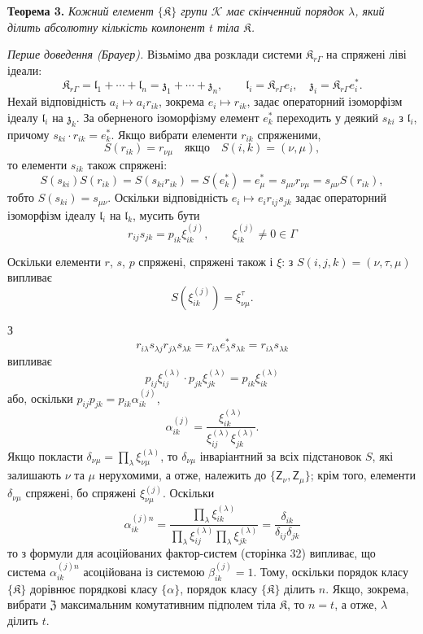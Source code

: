 \documentclass[11pt]{article}
\begin{document}
\textbf{Теорема 3.} \emph{Кожний елемент \(\{\mathfrak K\}\) групи \(\mathscr K\) має скінченний порядок \(\lambda\), який ділить абсолютну кількість компонент \(t\) тіла \(\mathfrak K\).}

\emph{Перше доведення (Брауер).} Візьмімо два розклади системи \(\mathfrak K_{r\Gamma}\) на спряжені ліві ідеали:
\[
\mathfrak K_{r\Gamma}=\mathfrak l_1+\cdots+\mathfrak l_n=\mathfrak z_1+\cdots+\mathfrak z_n,\qquad
\mathfrak l_i=\mathfrak K_{r\Gamma}e_i,\quad
\mathfrak z_i=\mathfrak K_{r\Gamma}e_i^*.
\]
Нехай відповідність \(a_i\mapsto a_ir_{ik}\), зокрема \(e_i\mapsto r_{ik}\), задає операторний ізоморфізм ідеалу \(\mathfrak l_i\) на \(\mathfrak z_k\). За оберненого ізоморфізму елемент \(e_k^*\) переходить у деякий \(s_{ki}\) з \(\mathfrak l_i\), причому \(s_{ki}\cdot r_{ik}=e_k^*\). Якщо вибрати елементи \(r_{ik}\) спряженими,
\[
S(r_{ik})=r_{\nu\mu}\quad\text{якщо}\quad S(i,k)=(\nu,\mu),
\]
то елементи \(s_{ik}\) також спряжені:
\[
S(s_{ki})S(r_{ik})=S(s_{ki}r_{ik})=S(e_k^*)=e_\mu^*
=s_{\mu\nu}r_{\nu\mu}=s_{\mu\nu}S(r_{ik}),
\]
тобто \(S(s_{ki})=s_{\mu\nu}\). Оскільки відповідність \(e_i\mapsto e_ir_{ij}s_{jk}\) задає операторний ізоморфізм ідеалу \(\mathfrak l_i\) на \(\mathfrak l_k\), мусить бути
\[
r_{ij}s_{jk}=p_{ik}\xi_{ik}^{(j)},\qquad
\xi_{ik}^{(j)}\ne0\in\Gamma
\]

Оскільки елементи \(r\), \(s\), \(p\) спряжені, спряжені також і \(\xi\): з \(S(i,j,k)=(\nu,\tau,\mu)\) випливає
\[
S(\xi_{ik}^{(j)})=\xi_{\nu\mu}^{\tau}.
\]

З
\[
r_{i\lambda}s_{\lambda j}r_{j\lambda}s_{\lambda k}
=r_{i\lambda}e_\lambda^*s_{\lambda k}
=r_{i\lambda}s_{\lambda k}
\]
випливає
\[
p_{ij}\xi_{ij}^{(\lambda)}\cdot p_{jk}\xi_{jk}^{(\lambda)}
=p_{ik}\xi_{ik}^{(\lambda)}
\]
або, оскільки \(p_{ij}p_{jk}=p_{ik}\alpha_{ik}^{(j)}\),
\[
\alpha_{ik}^{(j)}
=\frac{\xi_{ik}^{(\lambda)}}{\xi_{ij}^{(\lambda)}\xi_{jk}^{(\lambda)}}.
\]
Якщо покласти \(\delta_{\nu\mu}=\prod_{\lambda}\xi_{\nu\mu}^{(\lambda)}\), то \(\delta_{\nu\mu}\) інваріантний за всіх підстановок \(S\), які залишають \(\nu\) та \(\mu\) нерухомими, а отже, належить до \(\{\mathsf{Z}_\nu,\mathsf{Z}_\mu\}\); крім того, елементи \(\delta_{\nu\mu}\) спряжені, бо спряжені \(\xi_{\nu\mu}^{(j)}\). Оскільки
\[
\alpha_{ik}^{(j)n}
=\frac{\prod_{\lambda}\xi_{ik}^{(\lambda)}}
       {\prod_{\lambda}\xi_{ij}^{(\lambda)}\prod_{\lambda}\xi_{jk}^{(\lambda)}}
=\frac{\delta_{ik}}{\delta_{ij}\delta_{jk}}
\]
то з формули для асоційованих фактор-систем (сторінка 32) випливає, що система \(\alpha_{ik}^{(j)n}\) асоційована із системою \(\beta_{ik}^{(j)}=1\). Тому, оскільки порядок класу \(\{\mathfrak K\}\) дорівнює порядкові класу \(\{\alpha\}\), порядок класу \(\{\mathfrak K\}\) ділить \(n\). Якщо, зокрема, вибрати \(\mathfrak Z\) максимальним комутативним підполем тіла \(\mathfrak K\), то \(n=t\), а отже, \(\lambda\) ділить \(t\).
\end{document}
